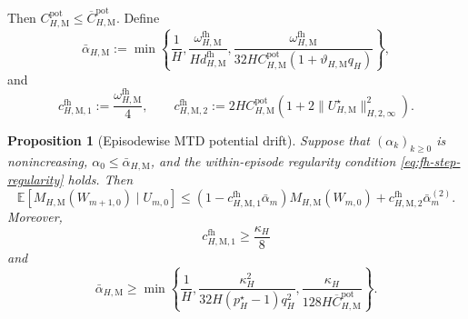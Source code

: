 \documentclass{article}
\newtheorem{proposition}[theorem]{Proposition}
\begin{document}
Then $C_{H,\mathrm M}^{\mathrm{pot}}\le\overline C_{H,\mathrm M}^{\mathrm{pot}}$. Define
\begin{equation}
\bar\alpha_{H,\mathrm M}:=\min\left\{\frac{1}{H},\frac{\omega_{H,\mathrm M}^{\mathrm{fh}}}{Hd_{H,\mathrm M}^{\mathrm{fh}}},\frac{\omega_{H,\mathrm M}^{\mathrm{fh}}}{32H C_{H,\mathrm M}^{\mathrm{pot}}(1+\vartheta_{H,\mathrm M}q_H)}\right\},
\end{equation}
and
\begin{equation}
c_{H,\mathrm M,1}^{\mathrm{fh}}:=\frac{\omega_{H,\mathrm M}^{\mathrm{fh}}}{4},\qquad
c_{H,\mathrm M,2}^{\mathrm{fh}}:=2H C_{H,\mathrm M}^{\mathrm{pot}}\left(1+2\lVert U_{H,\mathrm M}^\star\rVert_{H,2,\infty}^2\right).
\end{equation}

\begin{proposition}[Episodewise MTD potential drift]
\label{prop:fh-mtd-drift}
Suppose that $(\alpha_k)_{k\ge0}$ is nonincreasing, $\alpha_0\le\bar\alpha_{H,\mathrm M}$, and the within-episode regularity condition \eqref{eq:fh-step-regularity} holds. Then
\begin{equation}
\mathbb E\left[M_{H,\mathrm M}(W_{m+1,0})\mid U_{m,0}\right]\le\left(1-c_{H,\mathrm M,1}^{\mathrm{fh}}\bar\alpha_m\right)M_{H,\mathrm M}(W_{m,0})+c_{H,\mathrm M,2}^{\mathrm{fh}}\bar\alpha_m^{(2)}.
\end{equation}
Moreover,
\begin{equation}
c_{H,\mathrm M,1}^{\mathrm{fh}}\ge\frac{\kappa_H}{8}
\end{equation}
and
\begin{equation}
\bar\alpha_{H,\mathrm M}\ge\min\left\{\frac{1}{H},\frac{\kappa_H^2}{32H(p_H^\star-1)q_H^2},\frac{\kappa_H}{128H\overline C_{H,\mathrm M}^{\mathrm{pot}}}\right\}.
\end{equation}
\end{proposition}
\end{document}
